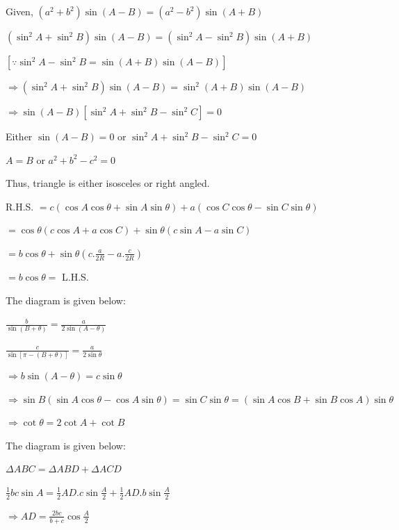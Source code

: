 \item Given, $(a^2 + b^2)\sin(A - B) = (a^2 - b^2)\sin(A + B)$

  $(\sin^2A + \sin^2B)\sin(A - B) = (\sin^2A - \sin^2B)\sin(A + B)$

  $[\because \sin^2A - \sin^2B = \sin(A + B)\sin(A - B)]$

  $\Rightarrow (\sin^2A + \sin^2B)\sin(A - B) = \sin^2(A + B)\sin(A - B)$

  $\Rightarrow \sin(A - B)[\sin^2A + \sin^2B - \sin^2C] = 0$

  Either $\sin(A - B) = 0$ or $\sin^2A + \sin^2B - \sin^2C = 0$

  $A = B$ or $a^2 + b^2 - c^2 = 0$

  Thus, triangle is either isosceles or right angled.

\item R.H.S. $= c(\cos A\cos\theta + \sin A\sin\theta) + a(\cos C\cos\theta - \sin C\sin\theta)$

  $= \cos\theta(c\cos A + a\cos C) + \sin\theta(c\sin A - a\sin C)$

  $=b\cos\theta + \sin\theta\left(c.\frac{a}{2R} - a.\frac{c}{2R}\right)$

  $= b\cos\theta =$ L.H.S.

\item The diagram is given below:

  \startplacefigure
    \externalfigure[18_9.pdf]
  \stopplacefigure

  $\frac{b}{\sin(B + \theta)} = \frac{a}{2\sin(A - \theta)}$

  $\frac{c}{\sin[\pi -(B + \theta)]} = \frac{a}{2\sin\theta}$

  $\Rightarrow b\sin(A - \theta) = c\sin\theta$

  $\Rightarrow \sin B(\sin A\cos\theta - \cos A\sin\theta) = \sin C\sin\theta = (\sin A\cos B + \sin B \cos A)\sin\theta$

  $\Rightarrow \cot\theta = 2\cot A + \cot B$

\item The diagram is given below:

  \startplacefigure
    \externalfigure[18_10.pdf]
  \stopplacefigure

  $\Delta ABC = \Delta ABD + \Delta ACD$

  $\frac{1}{2}bc\sin A = \frac{1}{2}AD.c\sin\frac{A}{2} + \frac{1}{2}AD.b\sin\frac{A}{2}$

  $\Rightarrow AD = \frac{2bc}{b + c}\cos\frac{A}{2}$

